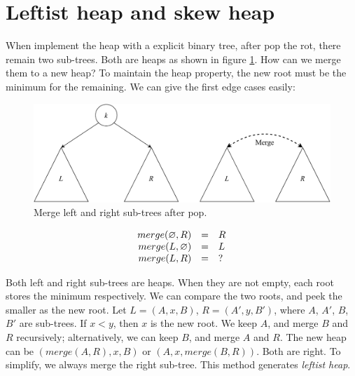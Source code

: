 \documentclass[b5paper]{article}
\begin{document}
\begin{Answer}
\end{Answer}

\section{Leftist heap and skew heap}
\label{ebheap}

When implement the heap with a explicit binary tree, after pop the rot, there remain two sub-trees. Both are heaps as shown in figure \ref{fig:lvr}. How can we merge them to a new heap? To maintain the heap property, the new root must be the minimum for the remaining. We can give the first edge cases easily:

\begin{figure}[htbp]
  \centering
  \includegraphics[scale=0.5]{img/lkr}
  \caption{Merge left and right sub-trees after pop.}
  \label{fig:lvr}
\end{figure}

\[
\begin{array}{rcl}
merge(\varnothing, R) & = & R \\
merge(L, \varnothing) & = & L \\
merge(L, R) & = & ? \\
\end{array}
\]

Both left and right sub-trees are heaps. When they are not empty, each root stores the minimum respectively. We can compare the two roots, and peek the smaller as the new root. Let $L = (A, x, B)$, $R = (A', y, B')$, where $A$, $A'$, $B$, $B'$ are sub-trees. If $x < y$, then $x$ is the new root. We keep $A$, and merge $B$ and $R$ recursively; alternatively, we can keep $B$, and merge $A$ and $R$. The new heap can be $(merge(A, R), x, B)$ or $(A, x, merge(B, R))$. Both are right. To simplify, we always merge the right sub-tree. This method generates {\em leftist heap}.
\end{document}
